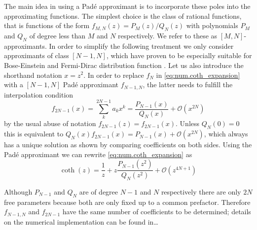 The main idea in using a Padé approximant is to incorporate these poles into the approximating functions.
The simplest choice is the class of rational functions, that is functions of the form $f_{M,N}(z) = P_M(z) / Q_N(z)$ with polynomials $P_M$ and $Q_N$ of degree less than $M$ and $N$ respectively.
We refer to these as $[M,N]$-approximants.
In order to simplify the following treatment we only consider approximants of class $[N-1, N]$, which have proven to be especially suitable for Bose-Einstein and Fermi-Dirac distribution function \cite{Hu11_pade}.
Let us also introduce the shorthand notation $x = z^2$.
In order to replace $f_N$ in \autoref{eq:num.coth_expansion} with a $[N-1,N]$ Padé approximant $f_{N-1,N}$, the latter needs to fulfill the interpolation condition
\begin{equation*}
  f_{2N-1}(x) = \sum_k^{2N-1} a_k x^k = \frac{P_{N-1}(x)}{Q_N(x)} + \mathcal{O}(x^{2N})
\end{equation*}
by the usual abuse of notation $f_{2N-1}(z) = f_{2N-1}(x)$.
Unless $Q_N(0) = 0$ this is equivalent to $Q_N(x)f_{2N-1}(x) = P_{N-1}(x) + \mathcal{O}(x^{2N})$, which always has a unique solution as shown by comparing coefficients on both sides.
Using the Padé approximant we can rewrite \autoref{eq:num.coth_expansion} as
\begin{equation}
  \coth(z) = \frac{1}{z} + z \frac{P_{N-1}(z^2)}{Q_N(z^2)} + \mathcal{O}(z^{4N+1})
  \label{eq:num.coth_pade}
\end{equation}

Although $P_{N-1}$ and $Q_N$ are of degree $N-1$ and $N$ respectively there are only $2N$ free parameters because both are only fixed up to a common prefactor.
Therefore $f_{N-1,N}$ and $f_{2N-1}$ have the same number of coefficients to be determined; details on the numerical implementation can be found in\dots

